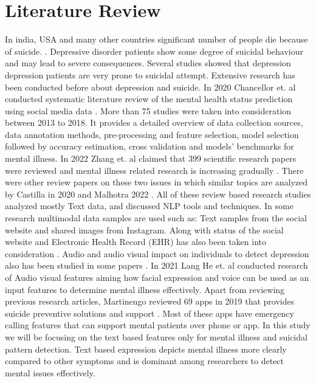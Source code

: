 \documentclass[12pt, letterpaper]{article}
\begin{document}
\section{Literature Review}
In india, USA and many other countries significant number of people die because of suicide. \cite{havigerova2019text, singh2022startling}. Depressive disorder patients show some degree of suicidal behaviour and may lead to severe consequences. \cite{vuorilehto2006suicidal, mcgirr2007examination, hawton2013risk} Several studies showed that depression depression patients are very prone to suicidal attempt.  
Extensive research has been conducted before about depression and suicide. In 2020 Chancellor et. al conducted systematic literature review of the mental health status prediction using social media data \cite{chancellor2020methods}. More than 75 studies were taken into consideration between 2013 to 2018. It provides a detailed overview of data collection sources, data annotation methods, pre-processing and feature selection, model selection followed by accuracy estimation, cross validation and models’ benchmarks for mental illness. In 2022 Zhang et. al claimed that 399 scientific research papers were reviewed and mental illness related research is increasing gradually \cite{zhang2022natural}. There were other review papers on these two issues in which similar topics are analyzed by Castilla in 2020 \cite{castillo2020suicide}  and Malhotra 2022 \cite{malhotra2022deep}. All of these review based research studies analyzed mostly Text data, and discussed NLP tools and techniques. In some research multimodal data samples are used such as: Text samples from the social website and shared images from Instagram. Along with status of the social website and Electronic Health Record (EHR) has also been taken into consideration \cite{zheng2020development, mann2020see}. Audio and audio visual impact on individuals to detect depression also has been studied in some papers \cite{ye2021multi, he2022deep}. In 2021 Lang He et. al conducted research of Audio visual features \cite{he2022deep} aiming how facial expression and voice can be used as an input features to determine mental illness effectively. Apart from reviewing previous research articles, Martinengo reviewed 69 apps in 2019 that provides suicide preventive solutions and support \cite{martinengo2019suicide}. Most of these apps have emergency calling features that can support mental patients over phone or app. In this study we will be focusing on the text based features only for mental illness and suicidal pattern detection. Text based expression depicts mental illness more clearly compared to other symptoms and is dominant among researchers to detect mental issues effectively.
\end{document}
